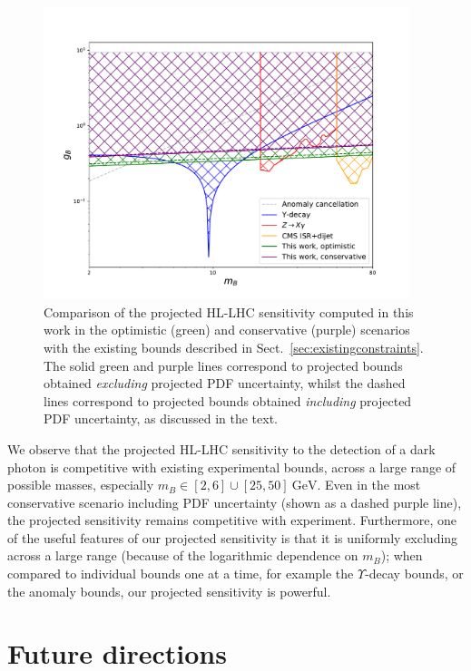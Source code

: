 \documentclass[withindex,glossary]{cam-thesis}
\begin{document}
\begin{figure}
\centering
\includegraphics[width=0.95\textwidth]{darkphoton_figures/bounds_plot.pdf}
\caption{Comparison of the projected HL-LHC sensitivity computed in
  this work in the optimistic (green) and conservative (purple) scenarios with the
  existing bounds described in Sect.~\ref{sec:existingconstraints}. The solid green and
  purple lines correspond to projected bounds obtained \textit{excluding} projected PDF uncertainty, whilst the 
  dashed lines correspond to projected bounds obtained \textit{including} projected PDF uncertainty, as discussed in
  the text.}
\label{fig:limits}
\end{figure}

We observe that the projected HL-LHC sensitivity to the detection of a dark photon is competitive with existing experimental bounds, across a large range of possible masses, especially $m_B \in [2,6] \cup [25, 50]\ \text{GeV}$. Even in the most conservative scenario including PDF uncertainty (shown as a dashed purple line), the projected sensitivity remains competitive with experiment. Furthermore, one of the useful features of our projected sensitivity is that it is uniformly excluding across a large range (because of the logarithmic dependence on $m_B$); when compared to individual bounds one at a time, for example the $\Upsilon$-decay bounds, or the anomaly bounds, our projected sensitivity is powerful.


\section{Future directions}
\label{sec:dark_future}
\end{document}
